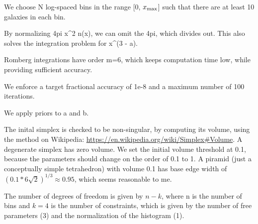 We choose N log-spaced bins in the range [0, $x_{\rm max}$] such that there are at least 10 galaxies in each bin.

By normalizing 4pi x^2 n(x), we can omit the 4pi, which divides out. This also solves the integration problem for x^(3 - a).

Romberg integrations have order m=6, which keeps computation time low, while providing sufficient accuracy.

We enforce a target fractional accuracy of 1e-8 and a maximum number of 100 iterations.

We apply priors to a and b.

The inital simplex is checked to be non-singular, by computing its volume, using the method on Wikipedia: \url{https://en.wikipedia.org/wiki/Simplex#Volume}. 
A degenerate simplex has zero volume. We set the initial volume threshold at 0.1, because the parameters should change on the order of 0.1 to 1. A piramid 
(just a conceptually simple tetrahedron) with volume 0.1 has base edge width of $(0.1 * 6 \sqrt{2})^{1/3} \approx 0.95$, which seems reasonable to me.

The number of degrees of freedom is given by $n - k$, where n is the number of bins and $k = 4$ is the number of constraints, which is given by the
number of free parameters (3) and the normalization of the histogram (1).